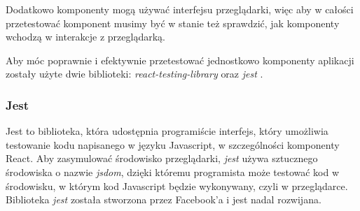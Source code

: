Dodatkowo komponenty mogą używać interfejsu przeglądarki, więc aby w całości przetestować komponent musimy być w stanie też sprawdzić, jak komponenty wchodzą w interakcje z przeglądarką.

Aby móc poprawnie i efektywnie przetestować jednostkowo komponenty aplikacji zostały użyte dwie biblioteki: \emph{react-testing-library} \cite{ref_rtl_doc} oraz \emph{jest} \cite{ref_jest_doc}.

\subsubsection{Jest} Jest to biblioteka, która udostępnia programiście interfejs, który umożliwia testowanie kodu napisanego w języku Javascript, w szczególności komponenty React. Aby zasymulować środowisko przeglądarki,
\emph{jest} używa sztucznego środowiska o nazwie \emph{jsdom}, dzięki któremu programista może testować kod w środowisku, w którym kod Javascript będzie wykonywany, czyli w przeglądarce. Biblioteka \emph{jest} została stworzona przez Facebook'a i jest nadal rozwijana.


